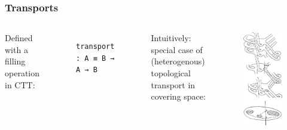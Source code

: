 \documentclass[english,draft]{beamer}
\begin{document}
\begin{frame}[fragile]
\frametitle{Transports}
 
 
 \begin{columns}%
        Defined with a filling operation in CTT:
        \begin{figure}
            \begin{BVerbatim}
transport : A ≡ B → A → B
            \end{BVerbatim}
            \end{figure}
        Intuitively: special case of (heterogenous) topological transport in covering space:
        \begin{figure}
 \includegraphics[height=0.8\textheight]{figures/cover}
 \end{figure}

\end{columns}

 
 

 
\end{frame}
\end{document}
